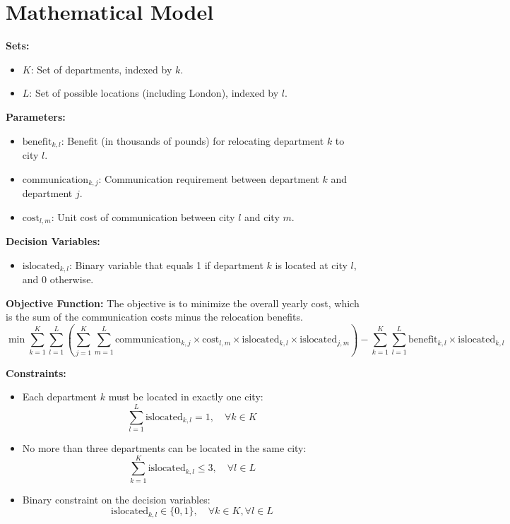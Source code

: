 \documentclass{article}
\begin{document}
\section*{Mathematical Model}

\textbf{Sets:}
\begin{itemize}
    \item \( K \): Set of departments, indexed by \( k \).
    \item \( L \): Set of possible locations (including London), indexed by \( l \).
\end{itemize}

\textbf{Parameters:}
\begin{itemize}
    \item \( \text{benefit}_{k,l} \): Benefit (in thousands of pounds) for relocating department \( k \) to city \( l \).
    \item \( \text{communication}_{k,j} \): Communication requirement between department \( k \) and department \( j \).
    \item \( \text{cost}_{l,m} \): Unit cost of communication between city \( l \) and city \( m \).
\end{itemize}

\textbf{Decision Variables:}
\begin{itemize}
    \item \( \text{islocated}_{k,l} \): Binary variable that equals 1 if department \( k \) is located at city \( l \), and 0 otherwise.
\end{itemize}

\textbf{Objective Function:}
The objective is to minimize the overall yearly cost, which is the sum of the communication costs minus the relocation benefits.
\[
\min \sum_{k=1}^{K} \sum_{l=1}^{L} \left( \sum_{j=1}^{K} \sum_{m=1}^{L} \text{communication}_{k,j} \times \text{cost}_{l,m} \times \text{islocated}_{k,l} \times \text{islocated}_{j,m} \right) - \sum_{k=1}^{K} \sum_{l=1}^{L} \text{benefit}_{k,l} \times \text{islocated}_{k,l}
\]

\textbf{Constraints:}
\begin{itemize}
    \item Each department \( k \) must be located in exactly one city:
    \[
    \sum_{l=1}^{L} \text{islocated}_{k,l} = 1, \quad \forall k \in K
    \]

    \item No more than three departments can be located in the same city:
    \[
    \sum_{k=1}^{K} \text{islocated}_{k,l} \leq 3, \quad \forall l \in L
    \]

    \item Binary constraint on the decision variables:
    \[
    \text{islocated}_{k,l} \in \{0, 1\}, \quad \forall k \in K, \forall l \in L
    \]
\end{itemize}
\end{document}
